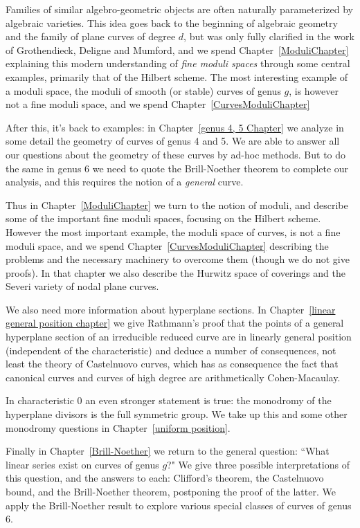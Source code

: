 Families of similar algebro-geometric objects are often naturally parameterized by algebraic varieties. This idea goes back to the beginning of algebraic geometry and the family of plane curves of degree $d$, but was only fully clarified in the work of Grothendieck, Deligne and Mumford, and we spend Chapter~\ref{ModuliChapter} explaining this modern understanding of \emph{fine moduli spaces} through some central examples, primarily that of
the Hilbert scheme. The most interesting example of a moduli space, the moduli of smooth (or stable) curves of genus $g$, is however not a fine moduli space, and we spend Chapter~\ref{CurvesModuliChapter}

After this, it's back to examples: in Chapter~\ref{genus 4, 5 Chapter} we analyze in some detail the geometry of curves of genus 4 and 5. We are able to answer all our questions about the geometry of these curves by ad-hoc methods. But to do the same  in genus 6 we need to quote the Brill-Noether theorem to complete our analysis, and this requires the notion of a \emph{general} curve. 

Thus in Chapter~\ref{ModuliChapter} we turn to the notion of moduli, and describe some of the important fine moduli spaces, focusing
on the Hilbert scheme. However the most important example, the moduli space of curves, is not a fine moduli space, and we spend
Chapter~\ref{CurvesModuliChapter} describing the problems and the necessary machinery to overcome them (though we do not give
proofs). In that chapter we also describe the Hurwitz space of coverings and the Severi variety of nodal plane curves.

We also need more information about hyperplane sections. In Chapter~\ref{linear general position chapter} we give Rathmann's proof that
the points of a general hyperplane section of an irreducible reduced curve are in linearly general position (independent of the characteristic)
and deduce a number of consequences, not least the theory of Castelnuovo curves, which has as consequence the 
fact that canonical curves and curves of high degree are arithmetically Cohen-Macaulay.

In characteristic 0 an even stronger statement is true: the monodromy of the hyperplane divisors is the full symmetric group. We take up this
and some other monodromy questions in Chapter~\ref{uniform position}.

Finally in Chapter~\ref{Brill-Noether} we return to the general question: ``What linear series exist on curves of genus $g$?" We give three possible interpretations of this question, and the answers to each: Clifford's theorem, the Castelnuovo bound, and the Brill-Noether theorem, postponing the proof of the latter. We apply the Brill-Noether result to explore  various special classes of curves of genus 6.

